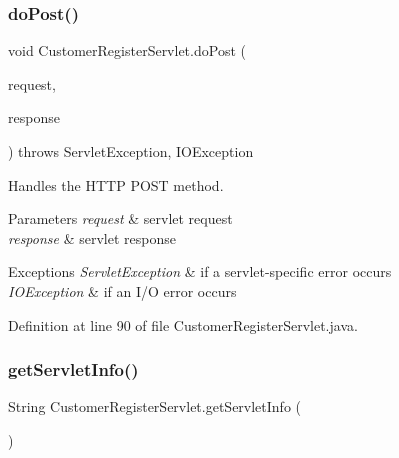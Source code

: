 \mbox{\label{class_customer_register_servlet_a73046b2af05ebce0606ff854c444c1cd}} 
\subsubsection{\texorpdfstring{doPost()}{doPost()}}
{\footnotesize\ttfamily void Customer\+Register\+Servlet.\+do\+Post (\begin{DoxyParamCaption}\item[{Http\+Servlet\+Request}]{request,  }\item[{Http\+Servlet\+Response}]{response }\end{DoxyParamCaption}) throws Servlet\+Exception, I\+O\+Exception\hspace{0.3cm}{\ttfamily [protected]}}

Handles the H\+T\+TP {\ttfamily P\+O\+ST} method.


\begin{DoxyParams}{Parameters}
{\em request} & servlet request \\
\hline
{\em response} & servlet response \\
\hline
\end{DoxyParams}

\begin{DoxyExceptions}{Exceptions}
{\em Servlet\+Exception} & if a servlet-\/specific error occurs \\
\hline
{\em I\+O\+Exception} & if an I/O error occurs \\
\hline
\end{DoxyExceptions}


Definition at line 90 of file Customer\+Register\+Servlet.\+java.

\mbox{\label{class_customer_register_servlet_abe5627557f5da5d340e39f3409700b3e}} 
\subsubsection{\texorpdfstring{getServletInfo()}{getServletInfo()}}
{\footnotesize\ttfamily String Customer\+Register\+Servlet.\+get\+Servlet\+Info (\begin{DoxyParamCaption}{ }\end{DoxyParamCaption})}

